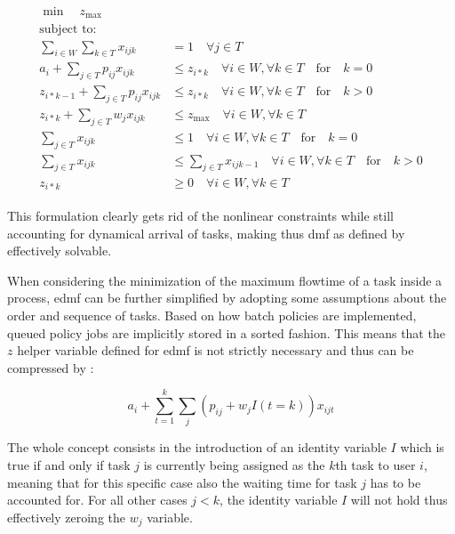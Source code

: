 \begin{align}
	\begin{split}
	    \min \quad z_{\text{max}}\\
	    \text{subject to:} \\
	    \sum_{i \in W} \sum_{k \in T} x_{ijk} &= 1 \quad \forall j \in T\\
	    a_i + \sum_{j \in T} p_{ij} x_{ijk} &\leq z_{i*k} \quad \forall i \in W, \forall k \in T \quad \text{for} \quad k=0\\
	    z_{i*k-1} + \sum_{j \in T} p_{ij} x_{ijk} &\leq z_{i*k} \quad \forall i \in W, \forall k \in T \quad \text{for} \quad k>0\\
	    z_{i*k}+ \sum_{j \in T} w_j x_{ijk} &\leq z_{\text{max}} \quad \forall i \in W, \forall k \in T\\
	    \sum_{j \in T} x_{ijk} &\leq 1 \quad \forall i \in W, \forall k \in T \quad \text{for} \quad k=0\\
	    \sum_{j \in T} x_{ijk} &\leq \sum_{j \in T} x_{ijk-1} \quad \forall i \in W, \forall k \in T \quad \text{for} \quad k>0\\
	    z_{i*k} &\geq 0 \quad \forall i \in W, \forall k \in T
	\end{split}
\end{align}

This formulation clearly gets rid of the nonlinear constraints while still accounting for dynamical arrival of tasks, making thus \gls{dmf} as defined by \citet{Zeng2005} effectively solvable.

When considering the minimization of the maximum flowtime of a task inside a process, \gls{edmf} can be further simplified by adopting some assumptions about the order and sequence of tasks. Based on how batch policies are implemented, queued policy jobs are implicitly stored in a sorted fashion. This means that the $z$ helper variable defined for \gls{edmf} is not strictly necessary and thus can be compressed by :

\begin{equation}
\label{eq:simplified_z_with_k}
	a_i + \sum_{t=1}^k \sum_j (p_{ij} + w_j I(t=k))x_{ijt}
\end{equation}

The whole concept consists in the introduction of an identity variable $I$ which is true if and only if task $j$ is currently being assigned as the $k$th task to user $i$, meaning that for this specific case also the waiting time for task $j$ has to be accounted for. For all other cases \ie $j<k$, the identity variable $I$ will not hold thus effectively zeroing the $w_j$ variable.

